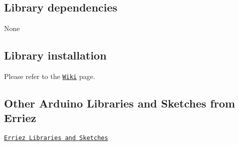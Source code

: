 \subsection*{Library dependencies}


\begin{DoxyItemize}
\item None
\end{DoxyItemize}

\subsection*{Library installation}

Please refer to the \href{https://github.com/Erriez/ErriezArduinoLibrariesAndSketches/wiki}{\tt Wiki} page.

\subsection*{Other Arduino Libraries and Sketches from Erriez}


\begin{DoxyItemize}
\item \href{https://github.com/Erriez/ErriezArduinoLibrariesAndSketches}{\tt Erriez Libraries and Sketches} 
\end{DoxyItemize}